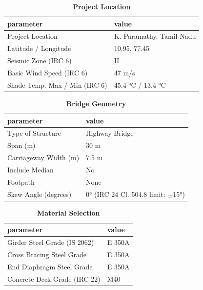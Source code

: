 \documentclass[12pt,a4paper]{report}
\numberwithin{table}{chapter}
\numberwithin{figure}{chapter}
\begin{document}
\begin{table}[H]
\caption{\textbf{Project Location}}
\label{subsec:project-location}
\begin{tabular}{|L{5.5cm}|L{8.5cm}|}
\hline
\textbf{parameter} & \textbf{value} \\
\hline
\textnormal{Project Location} & K. Paramathy, Tamil Nadu \\
\hline
\textnormal{Latitude / Longitude} & 10.95, 77.45 \\
\hline
\textnormal{Seismic Zone (IRC 6)} & II \\
\hline
\textnormal{Basic Wind Speed (IRC 6)} & 47 m/s \\
\hline
\textnormal{Shade Temp. Max / Min (IRC 6)} & 45.4 °C / 13.4 °C \\
\hline
\end{tabular}
\vspace{0.4cm}
\end{table}

\begin{table}[H]
\caption{\textbf{Bridge Geometry}}
\label{subsec:bridge-geometry}
\begin{tabular}{|L{5.5cm}|L{8.5cm}|}
\hline
\textbf{parameter} & \textbf{value} \\
\hline
\textnormal{Type of Structure} & Highway Bridge \\
\hline
\textnormal{Span (m)} & 30 m \\
\hline
\textnormal{Carriageway Width (m)} & 7.5 m \\
\hline
\textnormal{Include Median} & No \\
\hline
\textnormal{Footpath} & None \\
\hline
\textnormal{Skew Angle (degrees)} & 0° (IRC 24 Cl. 504.8 limit: $\pm$15°) \\
\hline
\end{tabular}
\end{table}
\vspace{0.4cm}

\begin{table}[H]
\caption{\textbf{Material Selection}}
\label{subsec:material}
\begin{tabular}{|L{5.5cm}|L{8.5cm}|}
\hline
\textbf{parameter} & \textbf{value} \\
\hline
\textnormal{Girder Steel Grade (IS 2062)} & E 350A \\
\hline
\textnormal{Cross Bracing Steel Grade} & E 350A \\
\hline
\textnormal{End Diaphragm Steel Grade} & E 350A \\
\hline
\textnormal{Concrete Deck Grade (IRC 22)} & M40 \\
\hline
\end{tabular}
\end{table}
\vspace{0.4cm}
\end{document}
